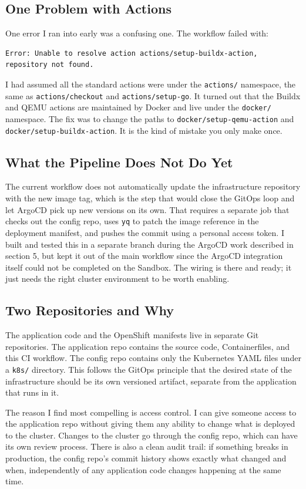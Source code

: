 \subsection{One Problem with Actions}

One error I ran into early was a confusing one. The workflow failed with:

\begin{lstlisting}
Error: Unable to resolve action actions/setup-buildx-action,
repository not found.
\end{lstlisting}

I had assumed all the standard actions were under the \texttt{actions/} namespace, the
same as \texttt{actions/checkout} and \texttt{actions/setup-go}. It turned out that the
Buildx and QEMU actions are maintained by Docker and live under the \texttt{docker/}
namespace. The fix was to change the paths to \texttt{docker/setup-qemu-action} and
\texttt{docker/setup-buildx-action}. It is the kind of mistake you only make once.

\subsection{What the Pipeline Does Not Do Yet}

The current workflow does not automatically update the infrastructure repository with the
new image tag, which is the step that would close the GitOps loop and let ArgoCD pick
up new versions on its own. That requires a separate job that checks out the config
repo, uses \texttt{yq} to patch the image reference in the deployment manifest, and
pushes the commit using a personal access token. I built and tested this in a separate
branch during the ArgoCD work described in section 5, but kept it out of the main
workflow since the ArgoCD integration itself could not be completed on the Sandbox. The
wiring is there and ready; it just needs the right cluster environment to be worth
enabling.

\subsection{Two Repositories and Why}

The application code and the OpenShift manifests live in separate Git repositories. The
application repo contains the source code, Containerfiles, and this CI workflow. The
config repo contains only the Kubernetes YAML files under a \texttt{k8s/} directory.
This follows the GitOps principle that the desired state of the infrastructure should be
its own versioned artifact, separate from the application that runs in it.

The reason I find most compelling is access control. I can give someone access to the
application repo without giving them any ability to change what is deployed to the
cluster. Changes to the cluster go through the config repo, which can have its own
review process. There is also a clean audit trail: if something breaks in production,
the config repo's commit history shows exactly what changed and when, independently of
any application code changes happening at the same time.
